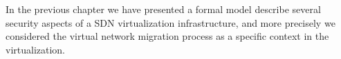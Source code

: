 In the previous chapter we have presented a formal model describe several security aspects of a SDN virtualization infrastructure, and more precisely we considered the virtual network migration process as a specific context in the virtualization.

